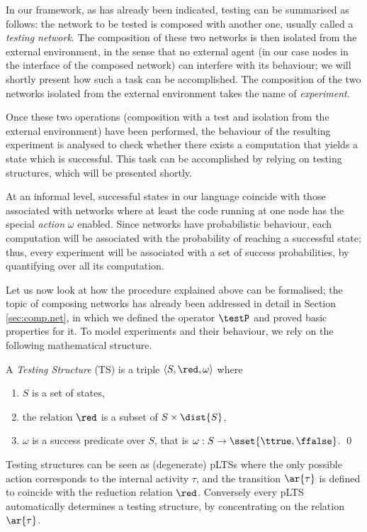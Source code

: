 \documentclass{LMCS}
\begin{document}
In our framework, as has already been indicated, testing can be summarised as follows: the network to be tested  is 
composed with another one, usually called a \emph{testing network}. 
The composition of these two networks is then isolated from the external environment, 
in the sense that no external agent (in our case nodes in the interface of the composed network) 
can interfere with its behaviour; we will shortly present how such a task can be 
accomplished. The composition of the two networks isolated from the external 
environment takes the name of \emph{experiment}. 



Once these two operations (composition with a test and isolation from the external environment) 
have been performed, the behaviour of the resulting experiment is analysed to check whether 
there exists a computation that yields a state which is successful. This task can be 
accomplished by relying on testing structures, which will be presented shortly.

At an informal level, successful states in our language coincide with those associated with networks 
where at least the code running at one node has the special \emph{action} $\omega$ enabled. 
Since networks have probabilistic behaviour, each computation will be associated with 
the probability  of reaching a successful state; thus, every experiment will be 
associated with a set of success probabilities, by quantifying over all its computation.

Let us now look at how the procedure explained above can be formalised; the topic 
of composing networks has already been addressed in detail in Section \ref{sec:comp.net}, 
in which we defined the operator $\testP$ and proved basic properties for it. To 
model experiments and their behaviour, we rely on the following mathematical structure.

\begin{defi}\label{def:testing}
  A \emph{Testing Structure} (TS) is a triple 
$\langle S, \red, \omega \rangle$ where 
\begin{enumerate}[label=(\roman*)]
\item $S$ is a set of states,

\item the relation $ \red$ is a subset of $S \times \dist{S}$,

\item $\omega$ is a success predicate over $S$, that is $\omega: S
  \rightarrow \sset{\ttrue,\ffalse}$. \qed
\end{enumerate}
\end{defi}
\noindent
Testing structures can be seen as (degenerate) pLTSs where the only
possible action corresponds to the internal activity $\tau$, and the
transition $\ar{\tau}$ is defined to coincide with the reduction
relation $\red$. 
 Conversely every pLTS automatically determines a testing structure,
by concentrating on the relation $\ar{\tau}$.
\end{document}
